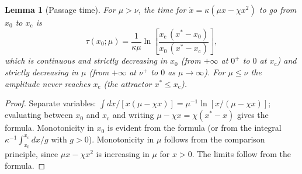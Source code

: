 \documentclass[11pt]{article}
\newtheorem{lemma}{Lemma}
\theoremstyle{definition}
\theoremstyle{remark}
\newcommand{\xc}{x_{\mathrm c}}
\begin{document}
\begin{lemma}[Passage time]\label{l4}
For $\mu>\nu$, the time for $\dot x=\kappa(\mu x-\chi x^2)$ to go from $x_0$ to $\xc$ is
\[
\tau(x_0;\mu)=\frac1{\kappa\mu}\ln\!\left[\frac{\xc\,(x^*-x_0)}{x_0\,(x^*-\xc)}\right],
\]
which is continuous and strictly decreasing in $x_0$ (from $+\infty$ at $0^+$ to $0$ at $\xc$) and strictly decreasing in $\mu$ (from $+\infty$ at $\nu^+$ to $0$ as $\mu\to\infty$). For $\mu\le\nu$ the amplitude never reaches $\xc$ (the attractor $x^*\le\xc$).
\end{lemma}
\begin{proof}
Separate variables: $\int dx/[x(\mu-\chi x)]=\mu^{-1}\ln[x/(\mu-\chi x)]$; evaluating between $x_0$ and $\xc$ and writing $\mu-\chi x=\chi(x^*-x)$ gives the formula. Monotonicity in $x_0$ is evident from the formula (or from the integral $\kappa^{-1}\int_{x_0}^{\xc}dx/g$ with $g>0$). Monotonicity in $\mu$ follows from the comparison principle, since $\mu x-\chi x^2$ is increasing in $\mu$ for $x>0$. The limits follow from the formula.
\end{proof}
\end{document}
